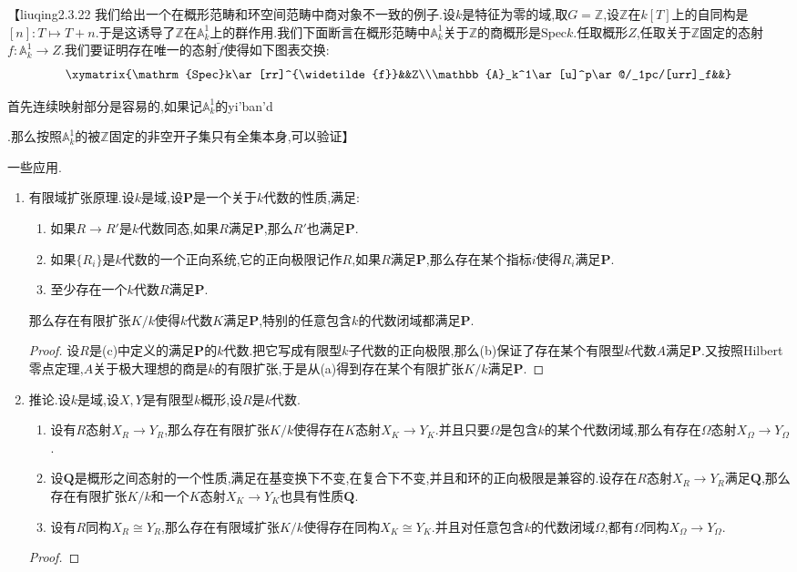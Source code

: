 【liuqing2.3.22
我们给出一个在概形范畴和环空间范畴中商对象不一致的例子.设$k$是特征为零的域,取$G=\mathbb{Z}$,设$\mathbb{Z}$在$k[T]$上的自同构是$[n]:T\mapsto T+n$.于是这诱导了$\mathbb{Z}$在$\mathbb{A}_k^1$上的群作用.我们下面断言在概形范畴中$\mathbb{A}_k^1$关于$\mathbb{Z}$的商概形是$\mathrm{Spec}k$.任取概形$Z$,任取关于$\mathbb{Z}$固定的态射$f:\mathbb{A}_k^1\to Z$.我们要证明存在唯一的态射$\widetilde{f}$使得如下图表交换:
$$\xymatrix{\mathrm{Spec}k\ar[rr]^{\widetilde{f}}&&Z\\\mathbb{A}_k^1\ar[u]^p\ar@/_1pc/[urr]_f&&}$$

首先连续映射部分是容易的,如果记$\mathbb{A}_k^1$的yi'ban'd    

.那么按照$\mathbb{A}_k^1$的被$\mathbb{Z}$固定的非空开子集只有全集本身,可以验证】


一些应用.
\begin{enumerate}
	
	
	\item 有限域扩张原理.设$k$是域,设$\textbf{P}$是一个关于$k$代数的性质,满足:
	\begin{enumerate}
		\item 如果$R\to R'$是$k$代数同态,如果$R$满足$\textbf{P}$,那么$R'$也满足$\textbf{P}$.
		\item 如果$\{R_i\}$是$k$代数的一个正向系统,它的正向极限记作$R$,如果$R$满足$\textbf{P}$,那么存在某个指标$i$使得$R_i$满足$\textbf{P}$.
		\item 至少存在一个$k$代数$R$满足$\textbf{P}$.
	\end{enumerate}
	
	那么存在有限扩张$K/k$使得$k$代数$K$满足$\textbf{P}$,特别的任意包含$k$的代数闭域都满足$\textbf{P}$.
	\begin{proof}
		
		设$R$是(c)中定义的满足$\textbf{P}$的$k$代数.把它写成有限型$k$子代数的正向极限,那么(b)保证了存在某个有限型$k$代数$A$满足$\textbf{P}$.又按照Hilbert零点定理,$A$关于极大理想的商是$k$的有限扩张,于是从(a)得到存在某个有限扩张$K/k$满足$\textbf{P}$.
	\end{proof}
	\item 推论.设$k$是域,设$X,Y$是有限型$k$概形,设$R$是$k$代数.
	\begin{enumerate}
		\item 设有$R$态射$X_R\to Y_R$,那么存在有限扩张$K/k$使得存在$K$态射$X_K\to Y_K$.并且只要$\Omega$是包含$k$的某个代数闭域,那么有存在$\Omega$态射$X_{\Omega}\to Y_{\Omega}$.
		\item 设$\textbf{Q}$是概形之间态射的一个性质,满足在基变换下不变,在复合下不变,并且和环的正向极限是兼容的.设存在$R$态射$X_R\to Y_R$满足$\textbf{Q}$,那么存在有限扩张$K/k$和一个$K$态射$X_K\to Y_K$也具有性质$\textbf{Q}$.
		\item 设有$R$同构$X_R\cong Y_R$,那么存在有限域扩张$K/k$使得存在同构$X_K\cong Y_K$.并且对任意包含$k$的代数闭域$\Omega$,都有$\Omega$同构$X_{\Omega}\to Y_{\Omega}$.
	\end{enumerate}
	\begin{proof}
		

\end{proof}
\end{enumerate}
